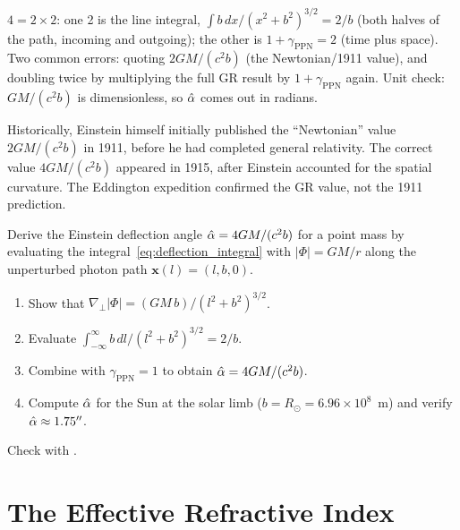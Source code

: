 \begin{annotation}
$4 = 2\times2$: one 2 is the line integral, $\int b\,dx/(x^2 + b^2)^{3/2} =
2/b$ (both halves of the path, incoming and outgoing); the other is
$1 + \gamma_{\mathrm{PPN}} = 2$ (time plus space).  Two common errors:
quoting $2GM/(c^2b)$ (the Newtonian/1911 value), and doubling twice by
multiplying the full GR result by $1 + \gamma_{\mathrm{PPN}}$ again.  Unit
check: $GM/(c^2b)$ is dimensionless, so $\hat{\alpha}$ comes out in radians.
\end{annotation}


\begin{remark}
Historically, Einstein himself initially published the ``Newtonian''
value $2GM/(c^2 b)$ in 1911, before he had completed general
relativity.  The correct value $4GM/(c^2 b)$ appeared in 1915, after
Einstein accounted for the spatial curvature.  The Eddington expedition
confirmed the GR value, not the 1911 prediction.
\end{remark}

\begin{exercise}
\label{ex:deflection_derivation}
Derive the Einstein deflection angle $\hat{\alpha} = 4GM/(c^2 b)$ for a
point mass by evaluating the integral~\eqref{eq:deflection_integral}
with $|\Phi| = GM/r$ along the unperturbed photon path
$\mathbf{x}(l) = (l, b, 0)$.
\begin{enumerate}[label=(\alph*)]
    \item Show that $\nabla_\perp |\Phi| = (GM\, b)/(l^2 + b^2)^{3/2}$.
    \item Evaluate
          $\int_{-\infty}^{\infty} b\, dl/(l^2 + b^2)^{3/2} = 2/b$.
    \item Combine with $\gamma_{\mathrm{PPN}} = 1$ to obtain
          $\hat{\alpha} = 4GM/(c^2 b)$.
    \item Compute $\hat{\alpha}$ for the Sun at the solar limb
          ($b = R_\odot = 6.96 \times 10^8$~m) and verify
          $\hat{\alpha} \approx 1.75''$.
\end{enumerate}
Check with
.
\end{exercise}


\section{The Effective Refractive Index}
\label{sec:refractive_index}

